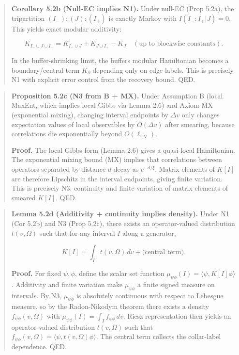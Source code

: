\begin{quote}
\textbf{Corollary 5.2b (Null-EC implies N1).} Under null-EC (Prop 5.2a), the tripartition \((I_-):(J):(I_+)\) is exactly Markov with \(I(I_-:I_+ | J) = 0\). This yields exact modular additivity:

\[
K_{I_- \cup J \cup I_+} = K_{I_- \cup J} + K_{J \cup I_+} - K_J
\quad (\text{up to blockwise constants}).
\]

In the buffer-shrinking limit, the buffer\textquotesingle s modular Hamiltonian becomes a boundary/central term \(K_\partial\) depending only on edge labels. This is precisely N1 with explicit error control from the recovery bound. QED.
\end{quote}

\begin{quote}
\textbf{Proposition 5.2c (N3 from B + MX).} Under Assumption B (local MaxEnt, which implies local Gibbs via Lemma 2.6) and Axiom MX (exponential mixing), changing interval endpoints by \(\Delta v\) only changes expectation values of local observables by \(O(\Delta v)\) after smearing, because correlations die exponentially beyond \(O(\ell_{\mathrm{UV}})\).

\textbf{Proof.} The local Gibbs form (Lemma 2.6) gives a quasi-local Hamiltonian. The exponential mixing bound (MX) implies that correlations between operators separated by distance \(d\) decay as \(e^{-d/\xi}\). Matrix elements of \(K[I]\) are therefore Lipschitz in the interval endpoints, giving finite variation. This is precisely N3: continuity and finite variation of matrix elements of smeared \(K[I]\). QED.
\end{quote}

\begin{quote}
\textbf{Lemma 5.2d (Additivity + continuity implies density).} Under N1 (Cor 5.2b) and N3 (Prop 5.2c), there exists an operator-valued distribution \(t(v,\Omega)\) such that for any interval \(I\) along a generator,

\[
K[I] = \int_I t(v,\Omega)\,dv + \text{(central term)}.
\]

\textbf{Proof.} For fixed \(\psi,\phi\), define the scalar set function \(\mu_{\psi\phi}(I) = \langle \psi, K[I] \phi \rangle\). Additivity and finite variation make \(\mu_{\psi\phi}\) a finite signed measure on intervals. By N3, \(\mu_{\psi\phi}\) is absolutely continuous with respect to Lebesgue measure, so by the Radon-Nikodym theorem there exists a density \(f_{\psi\phi}(v,\Omega)\) with \(\mu_{\psi\phi}(I)=\int_I f_{\psi\phi}\,dv\). Riesz representation then yields an operator-valued distribution \(t(v,\Omega)\) such that \(f_{\psi\phi}(v,\Omega)=\langle \psi, t(v,\Omega)
\phi \rangle\). The central term collects the collar-label dependence. QED.
\end{quote}

